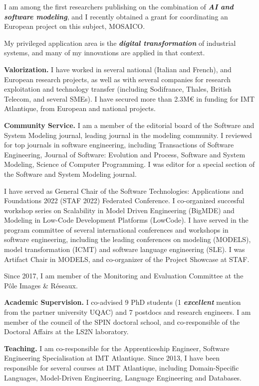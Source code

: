 \documentclass[10pt,a4paper]{article}
\begin{document}
I am among the first researchers publishing on the combination of  \textit{\textbf{AI and software modeling}}, and I recently obtained a grant for coordinating an European project on this subject, MOSAICO.

My privileged application area is the \textit{\textbf{digital transformation}} of industrial systems, and many of my innovations are applied in that context.

\textbf{Valorization.} I have worked in several national (Italian and French), and European research projects, as well as with several companies for research exploitation and technology transfer (including Sodifrance, Thales, British Telecom, and several SMEs). I have secured more than 2.3M€ in funding for IMT Atlantique, from European and national projects.

\textbf{Community Service.} I am a member of the editorial board of the Software and System Modeling journal, leading journal in the modeling community. I reviewed for top journals in software engineering, including Transactions of Software Engineering, Journal of Software: Evolution and Process, Software and System Modeling, Science of Computer Programming. I was editor for a special section of the Software and System Modeling journal.

I have served as General Chair of the Software Technologies: Applications and Foundations 2022 (STAF 2022) Federated Conference. I co-organized succesful workshop series on Scalability in Model Driven Engineering (BigMDE) and Modeling in Low-Code Development Platforms (LowCode). 
I have served in the program committee of several international conferences and workshops in software engineering, including the leading conferences on modeling (MODELS), model transformation (ICMT) and software language engineering (SLE). I was Artifact Chair in MODELS, and co-organizer of the Project Showcase at STAF.

Since 2017, I am member of the Monitoring and Evaluation Committee at the Pôle Images \& Réseaux.

\textbf{Academic Supervision.} I co-advised 9 PhD students (1 \textit{\textbf{excellent}} mention from the partner university UQAC) and 7 postdocs and research engineers. I am member of the council of the SPIN doctoral school, and co-responsible of the Doctoral Affairs at the LS2N laboratory.

\textbf{Teaching.} I am co-responsible for the Apprenticeship Engineer, Software Engineering Specialisation at IMT Atlantique. Since 2013, I have been responsible for several courses at IMT Atlantique, including Domain-Specific Languages, Model-Driven Engineering, Language Engineering and Databases.
\end{document}
